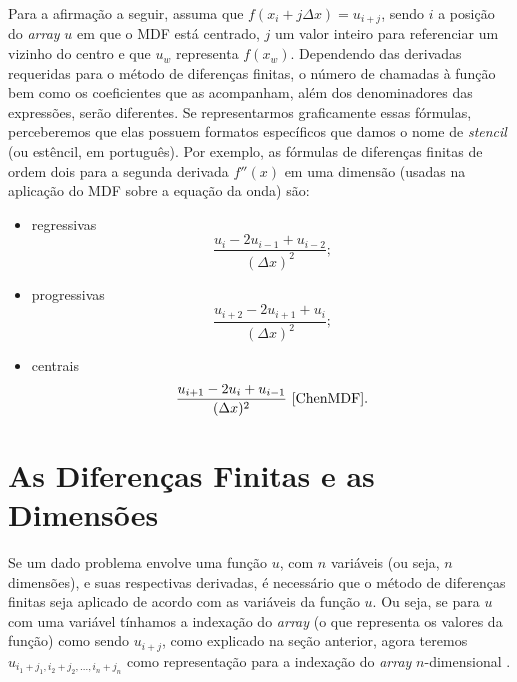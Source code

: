         Para a afirmação a seguir, assuma que $f(x_i + j\Delta x) = u_{i + j}$, sendo $i$ a posição do \textit{array} $u$ em que o MDF está centrado, $j$ um valor inteiro para referenciar um vizinho do centro e que $u_w$ representa $f(x_w)$. Dependendo das derivadas requeridas para o método de diferenças finitas, o número de chamadas à função bem como os coeficientes que as acompanham, além dos denominadores das expressões, serão diferentes. Se representarmos graficamente essas fórmulas, perceberemos que elas possuem formatos específicos que damos o nome de \textit{stencil} (ou estêncil, em português). Por exemplo, as fórmulas de diferenças finitas de ordem dois para a segunda derivada $f''(x)$ em uma dimensão (usadas na aplicação do MDF sobre a equação da onda) são:
        \begin{itemize}
            \item regressivas
            \begin{equation}
                \label{u''Reg}
                \dfrac{u_i - 2u_{i-1} + u_{i-2}}{(\Delta x)^2}\text{;}
            \end{equation}
            \item progressivas
            \begin{equation}
                \label{u''Prog}
                \dfrac{u_{i+2} - 2u_{i+1} + u_i}{(\Delta x)^2}\text{;}
            \end{equation}
            \item centrais
            \begin{equation}
                \label{u''Cent}
                \dfrac{u_{i+1} - 2u_{i} + u_{i-1}}{(\Delta x)^2}\text{ \cite{ChenMDF}.}
            \end{equation}
            
        \end{itemize}
        
        \section{As Diferenças Finitas e as Dimensões}
        
            Se um dado problema envolve uma função $u$, com $n$ variáveis (ou seja, $n$ dimensões), e suas respectivas derivadas, é necessário que o método de diferenças finitas seja aplicado de acordo com as variáveis da função $u$. Ou seja, se para $u$ com uma variável tínhamos a indexação do \textit{array} (o que representa os valores da função) como sendo $u_{i + j}$, como explicado na seção anterior, agora teremos $u_{i_1 + j_1, i_2 + j_2, ..., i_n + j_n}$ como representação para a indexação do \textit{array} $n$-dimensional \cite{notasAulas2017}. 
            
